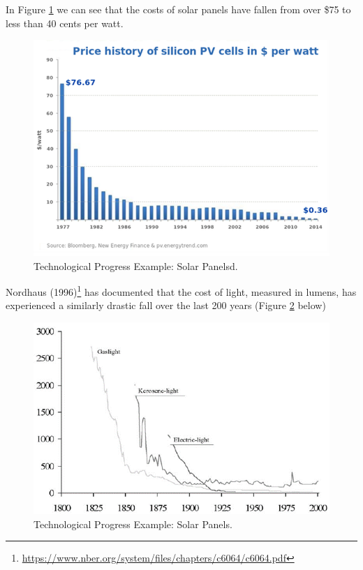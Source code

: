 \documentclass[
]{book}
\begin{document}
In Figure \ref{fig:supply09} we can see that the costs of solar panels have fallen from over \$75 to less than 40 cents per watt.

\begin{figure}

{\centering \includegraphics[width=0.75\linewidth]{img/supply/fig9} 

}

\caption{Technological Progress Example: Solar Panelsd.}\label{fig:supply09}
\end{figure}

Nordhaus (1996)\footnote{\url{https://www.nber.org/system/files/chapters/c6064/c6064.pdf}} has documented that the cost of light, measured in lumens, has experienced a similarly drastic fall over the last 200 years (Figure \ref{fig:supply10} below)

\begin{figure}

{\centering \includegraphics[width=0.75\linewidth]{img/supply/fig10} 

}

\caption{Technological Progress Example: Solar Panels.}\label{fig:supply10}
\end{figure}
\end{document}
